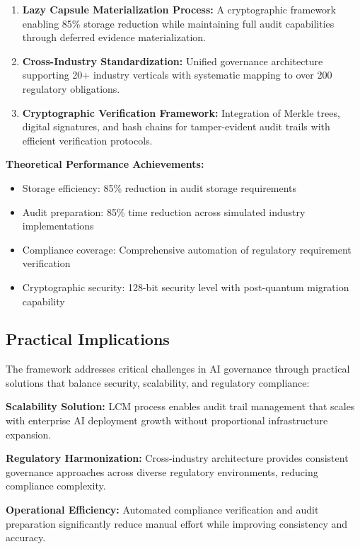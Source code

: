 \documentclass[12pt,a4paper]{article}
\begin{document}
\begin{enumerate}
\item \textbf{Lazy Capsule Materialization Process:} A cryptographic framework enabling 85\% storage reduction while maintaining full audit capabilities through deferred evidence materialization.

\item \textbf{Cross-Industry Standardization:} Unified governance architecture supporting 20+ industry verticals with systematic mapping to over 200 regulatory obligations.

\item \textbf{Cryptographic Verification Framework:} Integration of Merkle trees, digital signatures, and hash chains for tamper-evident audit trails with efficient verification protocols.
\end{enumerate}

\textbf{Theoretical Performance Achievements:}

\begin{itemize}
\item Storage efficiency: 85\% reduction in audit storage requirements
\item Audit preparation: 85\% time reduction across simulated industry implementations
\item Compliance coverage: Comprehensive automation of regulatory requirement verification
\item Cryptographic security: 128-bit security level with post-quantum migration capability
\end{itemize}

\subsection{Practical Implications}

The framework addresses critical challenges in AI governance through practical solutions that balance security, scalability, and regulatory compliance:

\textbf{Scalability Solution:} LCM process enables audit trail management that scales with enterprise AI deployment growth without proportional infrastructure expansion.

\textbf{Regulatory Harmonization:} Cross-industry architecture provides consistent governance approaches across diverse regulatory environments, reducing compliance complexity.

\textbf{Operational Efficiency:} Automated compliance verification and audit preparation significantly reduce manual effort while improving consistency and accuracy.
\end{document}
